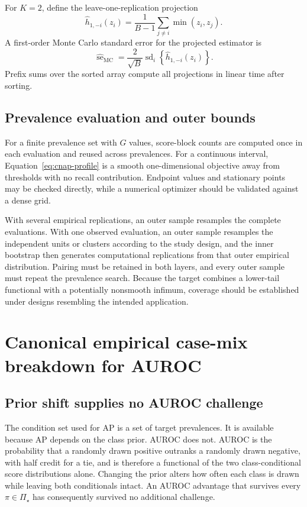 \documentclass[11pt]{article}
\newcommand{\PSet}{\Pi_\star}
\theoremstyle{remark}
\begin{document}
For $K=2$, define the leave-one-replication projection
\[
\widehat h_{1,-i}(z_i)
=
\frac1{B-1}\sum_{j\ne i}\min(z_i,z_j).
\]
A first-order Monte Carlo standard error for the projected estimator is
\begin{equation}
\widehat{\operatorname{se}}_{\mathrm{MC}}
=
\frac2{\sqrt B}
\operatorname{sd}_{i}
\left\{
\widehat h_{1,-i}(z_i)
\right\}.
\label{eq:mcse}
\end{equation}
Prefix sums over the sorted array compute all projections in linear time after sorting.

\subsection{Prevalence evaluation and outer bounds}

For a finite prevalence set with $G$ values, score-block counts are computed once in each evaluation and reused across prevalences. For a continuous interval, Equation~\eqref{eq:cnap-profile} is a smooth one-dimensional objective away from thresholds with no recall contribution. Endpoint values and stationary points may be checked directly, while a numerical optimizer should be validated against a dense grid.

With several empirical replications, an outer sample resamples the complete evaluations. With one observed evaluation, an outer sample resamples the independent units or clusters according to the study design, and the inner bootstrap then generates computational replications from that outer empirical distribution. Pairing must be retained in both layers, and every outer sample must repeat the prevalence search. Because the target combines a lower-tail functional with a potentially nonsmooth infimum, coverage should be established under designs resembling the intended application.

\section{Canonical empirical case-mix breakdown for AUROC}
\label{app:auroc}

\subsection{Prior shift supplies no AUROC challenge}

The condition set used for AP is a set of target prevalences. It is available
because AP depends on the class prior. AUROC does not. AUROC is the probability
that a randomly drawn positive outranks a randomly drawn negative, with half
credit for a tie, and is therefore a functional of the two class-conditional
score distributions alone. Changing the prior alters how often each class is
drawn while leaving both conditionals intact. An AUROC advantage that survives
every $\pi\in\PSet$ has consequently survived no additional challenge.
\end{document}
